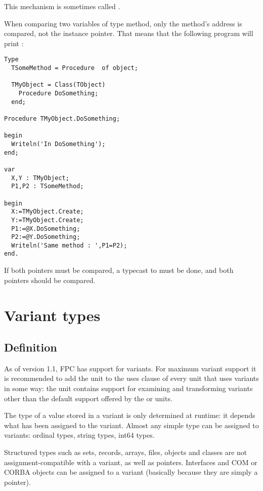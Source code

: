 This mechanism is sometimes called .

\begin{remark}
When comparing two variables of type method, only the method's address is compared,
not the instance pointer. That means that the following program will print :
\begin{verbatim}
Type 
  TSomeMethod = Procedure  of object;

  TMyObject = Class(TObject)
    Procedure DoSomething;
  end;

Procedure TMyObject.DoSomething;

begin
  Writeln('In DoSomething');
end;

var
  X,Y : TMyObject;
  P1,P2 : TSomeMethod;

begin
  X:=TMyObject.Create;
  Y:=TMyObject.Create;
  P1:=@X.DoSomething;
  P2:=@Y.DoSomething;
  Writeln('Same method : ',P1=P2);
end.
\end{verbatim}
If both pointers must be compared, a typecast to  must be done, and
both pointers should be compared.
\end{remark}

\section{Variant types}
 
\subsection{Definition}
As of version 1.1, FPC has support for variants. For maximum variant support 
it is recommended to add the  unit to the uses clause of every 
unit that uses variants in some way: the  unit contains support for
examining and transforming variants other than the default support offered
by the  or  units.

The type of a value stored in a variant is only determined at runtime: 
it depends what has been assigned to the variant. Almost any simple type 
can be assigned to variants: ordinal types, string types, int64 types.

Structured types such as sets, records, arrays, files, objects and classes 
are not assignment-compatible with a variant, as well as pointers. 
Interfaces and COM or CORBA objects can be assigned to a
variant (basically because they are simply a pointer).


